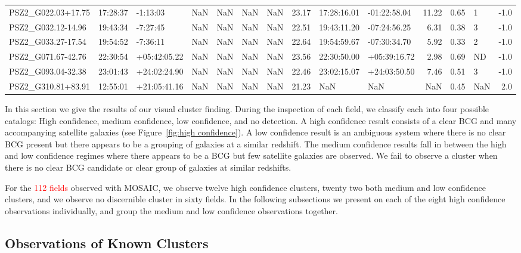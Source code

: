 \documentclass[apj, revtex4]{emulateapj}
\newcommand{\editorial}[1]{\textcolor{red}{#1}}
\begin{document}
\begin{table}
\begin{tabular}{lllrrrrrllrrlr}
 PSZ2\_G022.03+17.75 &  17:28:37 &      -1:13:03 & NaN &  NaN &   NaN &  NaN &    23.17 &   17:28:16.01 &  -01:22:58.04 &    11.22 &  0.65 &    1 &  -1.0 \\
 PSZ2\_G032.12-14.96 &  19:43:34 &      -7:27:45 & NaN &  NaN &   NaN &  NaN &    22.51 &   19:43:11.20 &  -07:24:56.25 &     6.31 &  0.38 &    3 &  -1.0 \\
 PSZ2\_G033.27-17.54 &  19:54:52 &      -7:36:11 & NaN &  NaN &   NaN &  NaN &    22.64 &   19:54:59.67 &  -07:30:34.70 &     5.92 &  0.33 &    2 &  -1.0 \\
 PSZ2\_G071.67-42.76 &  22:30:54 &  +05:42:05.22 & NaN &  NaN &   NaN &  NaN &    23.56 &   22:30:50.00 &  +05:39:16.72 &     2.98 &  0.69 &   ND &  -1.0 \\
 PSZ2\_G093.04-32.38 &  23:01:43 &  +24:02:24.90 & NaN &  NaN &   NaN &  NaN &    22.46 &   23:02:15.07 &  +24:03:50.50 &     7.46 &  0.51 &    3 &  -1.0 \\
 PSZ2\_G310.81+83.91 &  12:55:01 &  +21:05:41.16 & NaN &  NaN &   NaN &  NaN &    21.23 &           NaN &           NaN &      NaN &  0.45 &  NaN &   2.0 \\
	\hline
\end{tabular}
\label{tbl:preobserved} 
\end{table}

In this section we give the results of our visual cluster finding. During the inspection of each field, we classify each into four possible catalogs: High confidence, medium confidence, low confidence, and no detection. A high confidence result consists of a clear BCG and many accompanying satellite galaxies (see Figure~\ref{fig:high confidence}). A low confidence result is an ambiguous system where there is no clear BCG present but there appears to be a grouping of galaxies at a similar redshift. The medium confidence results fall in between the high and low confidence regimes where there appears to be a BCG but few satellite galaxies are observed. We fail to observe a cluster when there is no clear BCG candidate or clear group of galaxies at similar redshifts.

For the \editorial{112 fields} observed with MOSAIC, we observe twelve high confidence clusters, twenty two both medium and low confidence clusters, and we observe no discernible cluster in sixty fields. In the following subsections we present on each of the eight high confidence observations individually, and group the medium and low confidence observations together.

\subsection{Observations of Known Clusters}
\end{document}
